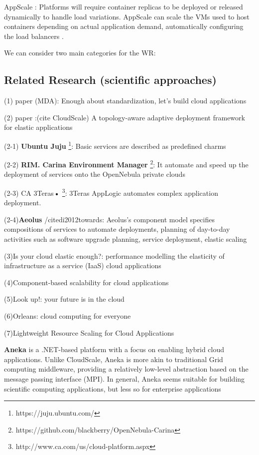 \documentclass{sig-alternate}
\begin{document}
AppScale \cite{chohan2009appscale}: Platforms will require container replicas to be deployed or released dynamically to handle load variations. AppScale can scale the VMs used to host containers depending on actual application demand, automatically configuring the load balancers \cite{vaquero2011dynamically}. 


We can consider two main categories for the WR: 
\subsection{Related Research (scientific approaches)}

(1) paper \cite{miranda2012enough} (MDA): Enough about standardization, let's build cloud applications

(2) paper \cite{keller2013topology}:(cite CloudScale) A topology-aware adaptive deployment framework for elastic applications 

(2-1) \textbf{Ubuntu Juju }\footnote{https://juju.ubuntu.com/}: Basic services are described as predefined charms

(2-2) \textbf{RIM. Carina Environment Manager} \footnote{https://github.com/blackberry/OpenNebula-Carina}: It automate and speed up the deployment of services onto the OpenNebula private clouds

(2-3) CA 3Teras\textbf{•} \footnote{http://www.ca.com/us/cloud-platform.aspx}: 3Teras AppLogic automates complex application deployment.

(2-4)\textbf{Aeolus} /cite{di2012towards}: Aeolus’s component model specifies compositions of services to automate deployments, planning of day-to-day activities such as software upgrade planning, service deployment, elastic scaling
 
(3)Is your cloud elastic enough?: performance modelling the elasticity of infrastructure as a service (IaaS) cloud applications \cite{brebner2012your}

(4)Component-based scalability for cloud applications \cite {kachele2013component}

(5)Look up!: your future is in the cloud \cite{larus2013look}

(6)Orleans: cloud computing for everyone \cite{bykov2011orleans}

(7)Lightweight Resource Scaling for Cloud Applications \cite{han2012lightweight}
 
\textbf{Aneka} is a .NET-based platform with a focus on enabling hybrid cloud applications. Unlike CloudScale, Aneka is more akin to traditional Grid computing middleware, providing a relatively low-level abstraction based on the message passing interface (MPI). In general, Aneka seems suitable for building scientific computing applications, but less so for enterprise applications ~\cite{Leitner2013}
\end{document}
